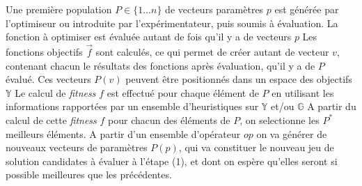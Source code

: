 \begin{itemize}[label=\textbullet]
	 Une première population $P \in \{1 \dotsc n\}$ de vecteurs paramètres ${p}$ est générée par l'optimiseur ou introduite par l'expérimentateur, puis soumis à évaluation.
	 La fonction à optimiser est évaluée autant de fois qu'il y a de vecteurs ${p}$
	 Les fonctions objectifs $\vec{f}$ sont calculés, ce qui permet de créer autant de vecteur ${v}$, contenant chacun le résultats des fonctions après évaluation, qu'il y a de $P$ évalué. Ces vecteurs $P(v)$ peuvent être positionnés dans un espace des objectifs $\mathbb{Y}$
	 Le calcul de \textit{fitness} $f$ est effectué pour chaque élément de $P$ en utilisant les informations rapportées par un ensemble d'heuristiques sur $\mathbb{Y}$ et/ou $\mathbb{G}$
	 A partir du calcul de cette \textit{fitness} $f$ pour chacun des éléments de $P$, on selectionne les $P^*$ meilleurs éléments.
	 A partir d'un ensemble d'opérateur ${op}$ on va générer de nouveaux vecteurs de paramètres $P(p)$, qui va constituer le nouveau jeu de solution candidates à évaluer à l'étape (1), et dont on espère qu'elles seront si possible meilleures que les précédentes.
\end{itemize}














